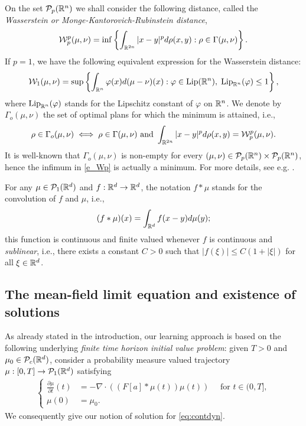 On the set $\mathcal{P}_p(\mathbb{R}^n)$ we shall consider the following distance, called the {\it Wasserstein or Monge-Kantorovich-Rubinstein distance},
\begin{align}  \label{e_Wp}
\mathcal{W}^p_p(\mu,\nu)=\inf \left \{ \int_{\mathbb{R}^{2n}} |x-y|^p d \rho(x,y) : \rho \in \Gamma(\mu,\nu) \right \}.
\end{align}
If $p = 1$, we have the following equivalent expression for the Wasserstein distance:
\begin{align*}
\mathcal{W}_1(\mu,\nu)=\sup \left \{ \int_{\mathbb{R}^n} \varphi(x) d (\mu-\nu)(x)  : \varphi \in \textup{Lip}(\mathbb{R}^n), \; \textup{Lip}_{\mathbb{R}^n}(\varphi) \leq 1 \right \},
\end{align*}
where $\textup{Lip}_{\mathbb{R}^n}(\varphi)$ stands for the Lipschitz constant of $\varphi$ on $\mathbb{R}^n$. We denote by $\Gamma_o(\mu,\nu)$ the set of optimal plans for which the minimum is attained, i.e.,
\begin{align*}
\rho \in \Gamma_o(\mu, \nu) \iff \rho \in \Gamma(\mu, \nu) \text{ and } \int_{\mathbb{R}^{2n}} | x - y |^p d \rho(x,y) = \mathcal{W}^p_p(\mu,\nu).
\end{align*}
It is well-known that $\Gamma_o(\mu, \nu)$ is non-empty for every $(\mu,\nu) \in \mathcal{P}_p(\mathbb{R}^n)\times\mathcal{P}_p(\mathbb{R}^n)$, hence the infimum in \eqref{e_Wp} is actually a minimum. For more details, see e.g. \cite{AGS,villani}.

For any $\mu \in \mathcal{P}_1(\mathbb{R}^d)$ and $f: \mathbb{R}^d \to \mathbb{R}^d$, the notation $f * \mu$ stands for the convolution of $f$ and $\mu$, i.e.,
\begin{align*}
(f * \mu)(x) = \int_{\mathbb{R}^d} f(x-y) d\mu(y);
\end{align*}
this function is continuous and finite valued whenever $f$ is continuous and \emph{sublinear}, i.e., there exists a constant $C > 0$ such that $| f(\xi) | \leq C (1 + |\xi|)$ for all $\xi \in \mathbb{R}^d$.

\subsection{The mean-field limit equation and existence of solutions}

As already stated in the introduction, our learning approach is based on the following underlying \textit{finite time horizon initial value problem}: given $T > 0$ and $\mu_0 \in \mathcal{P}_c(\mathbb{R}^d)$, consider a probability measure valued trajectory $\mu:[0,T]\rightarrow \mathcal{P}_1(\mathbb{R}^d)$ satisfying 
\begin{align}\label{eq:contdyn}
\left\{\begin{aligned}
\frac{\partial \mu}{\partial t}(t) &= -\nabla \cdot ((F[a]*\mu(t))\mu(t)) \quad \text{ for } t \in (0,T],\\
\mu(0) &=\mu_0.
\end{aligned}\right.
\end{align}
We consequently give our notion of solution for \eqref{eq:contdyn}.

